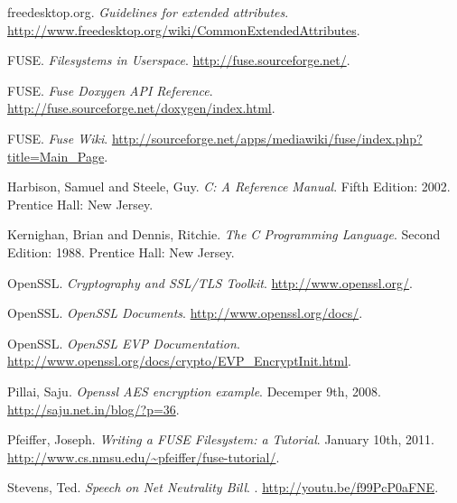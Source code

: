 \documentclass[12pt]{article}
\begin{document}
\begin{thebibliography}{3}

 freedesktop.org.
  \newblock \emph{Guidelines for extended attributes}.
  \newblock \url{http://www.freedesktop.org/wiki/CommonExtendedAttributes}.

 FUSE.
  \newblock \emph{Filesystems in Userspace}.
  \newblock \url{http://fuse.sourceforge.net/}.

 FUSE.
  \newblock \emph{Fuse Doxygen API Reference}.
  \newblock \url{http://fuse.sourceforge.net/doxygen/index.html}.

 FUSE.
  \newblock \emph{Fuse Wiki}.
  \newblock \url{http://sourceforge.net/apps/mediawiki/fuse/index.php?title=Main_Page}.

 Harbison, Samuel and Steele, Guy.
  \newblock \emph{C: A Reference Manual}.
  \newblock Fifth Edition: 2002.
  \newblock Prentice Hall: New Jersey.

 Kernighan, Brian and Dennis, Ritchie.
  \newblock \emph{The C Programming Language}.
  \newblock Second Edition: 1988.
  \newblock Prentice Hall: New Jersey.

 OpenSSL.
  \newblock \emph{Cryptography and SSL/TLS Toolkit}.
  \newblock \url{http://www.openssl.org/}.

 OpenSSL.
  \newblock \emph{OpenSSL Documents}.
  \newblock \url{http://www.openssl.org/docs/}.

 OpenSSL.
  \newblock \emph{OpenSSL EVP Documentation}.
  \newblock \url{http://www.openssl.org/docs/crypto/EVP_EncryptInit.html}.

 Pillai, Saju.
  \newblock \emph{Openssl AES encryption example}.
  \newblock Decemper 9th, 2008.
  \newblock \url{http://saju.net.in/blog/?p=36}.

 Pfeiffer, Joseph.
  \newblock \emph{Writing a FUSE Filesystem: a Tutorial}.
  \newblock January 10th, 2011.
  \newblock \url{http://www.cs.nmsu.edu/~pfeiffer/fuse-tutorial/}.

 Stevens, Ted.
  \newblock \emph{Speech on Net Neutrality Bill}.
  .
  \newblock \url{http://youtu.be/f99PcP0aFNE}.

\end{thebibliography}
\end{document}
